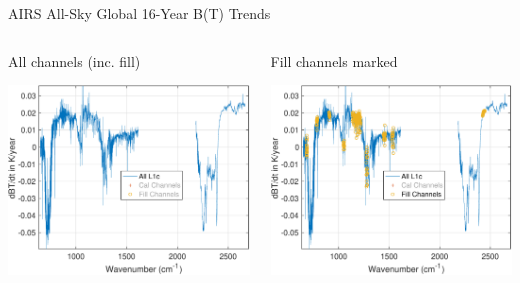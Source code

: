 \documentclass[10pt,t]{beamer}
\begin{document}
\begin{frame}[label={sec:org6583852}]{AIRS All-Sky Global 16-Year B(T) Trends}
\vspace{-0.35in}

\begin{columns}
\begin{column}{0.55\columnwidth}
\begin{block}{\footnotesize All channels (inc. fill)}
\vspace{-0.1in}
\begin{center}
\includegraphics[width=0.85\linewidth]{./Figs/Pdf/rand_global_trend_l1c_overview.pdf}
\end{center}
\end{block}
\end{column}


\begin{column}{0.55\columnwidth}
\begin{block}{\footnotesize Fill channels marked}
\vspace{-0.1in}
\begin{center}
\includegraphics[width=0.85\linewidth]{./Figs/Pdf/rand_global_trend_l1c_overview_fill_marked.pdf}
\end{center}
\end{block}
\end{column}
\end{columns}



\end{frame}
\end{document}
